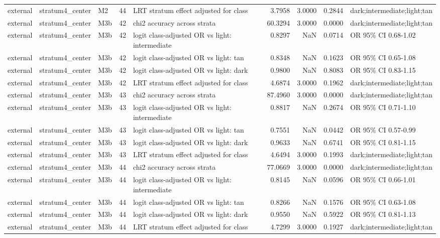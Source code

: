 \begin{tabular}{lllrlrrrl}
external & stratum4\_center & M2 & 44 & LRT stratum effect adjusted for class & 3.7958 & 3.0000 & 0.2844 & dark;intermediate;light;tan \\
external & stratum4\_center & M3b & 42 & chi2 accuracy across strata & 60.3294 & 3.0000 & 0.0000 & dark;intermediate;light;tan \\
external & stratum4\_center & M3b & 42 & logit class-adjusted OR vs light: intermediate & 0.8297 & NaN & 0.0714 & OR 95\% CI 0.68-1.02 \\
external & stratum4\_center & M3b & 42 & logit class-adjusted OR vs light: tan & 0.8348 & NaN & 0.1623 & OR 95\% CI 0.65-1.08 \\
external & stratum4\_center & M3b & 42 & logit class-adjusted OR vs light: dark & 0.9800 & NaN & 0.8083 & OR 95\% CI 0.83-1.15 \\
external & stratum4\_center & M3b & 42 & LRT stratum effect adjusted for class & 4.6874 & 3.0000 & 0.1962 & dark;intermediate;light;tan \\
external & stratum4\_center & M3b & 43 & chi2 accuracy across strata & 87.4960 & 3.0000 & 0.0000 & dark;intermediate;light;tan \\
external & stratum4\_center & M3b & 43 & logit class-adjusted OR vs light: intermediate & 0.8817 & NaN & 0.2674 & OR 95\% CI 0.71-1.10 \\
external & stratum4\_center & M3b & 43 & logit class-adjusted OR vs light: tan & 0.7551 & NaN & 0.0442 & OR 95\% CI 0.57-0.99 \\
external & stratum4\_center & M3b & 43 & logit class-adjusted OR vs light: dark & 0.9633 & NaN & 0.6741 & OR 95\% CI 0.81-1.15 \\
external & stratum4\_center & M3b & 43 & LRT stratum effect adjusted for class & 4.6494 & 3.0000 & 0.1993 & dark;intermediate;light;tan \\
external & stratum4\_center & M3b & 44 & chi2 accuracy across strata & 77.0669 & 3.0000 & 0.0000 & dark;intermediate;light;tan \\
external & stratum4\_center & M3b & 44 & logit class-adjusted OR vs light: intermediate & 0.8145 & NaN & 0.0596 & OR 95\% CI 0.66-1.01 \\
external & stratum4\_center & M3b & 44 & logit class-adjusted OR vs light: tan & 0.8266 & NaN & 0.1576 & OR 95\% CI 0.63-1.08 \\
external & stratum4\_center & M3b & 44 & logit class-adjusted OR vs light: dark & 0.9550 & NaN & 0.5922 & OR 95\% CI 0.81-1.13 \\
external & stratum4\_center & M3b & 44 & LRT stratum effect adjusted for class & 4.7299 & 3.0000 & 0.1927 & dark;intermediate;light;tan \\

\end{tabular}
